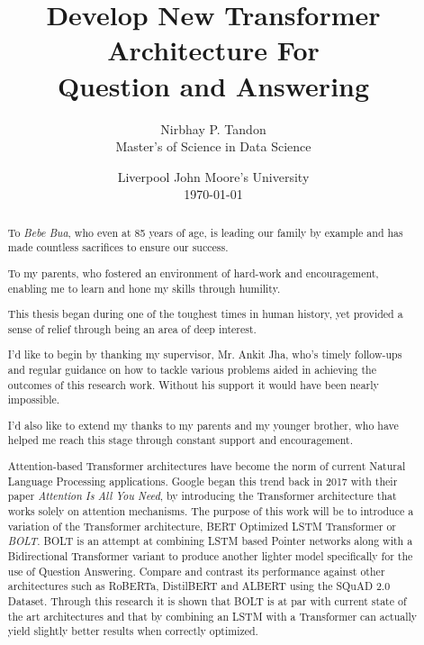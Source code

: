 \documentclass[a4paper,12pt]{report}
\begin{document}
    \title{Develop New Transformer Architecture For \\ Question and Answering}

    \author{Nirbhay P. Tandon\\ Master's of Science in Data Science}

    \date{\vfill Liverpool John Moore's University\\ \monthyeardate\today}
        \cleardoublepage%
    \maketitle
\clearpage
\renewcommand{\abstractname}{Dedication}
\begin{abstract}
	 To \textit{Bebe Bua}, who even at 85 years of age, is leading our family by example and has made countless sacrifices to ensure our success. 
	
	To my parents, who fostered an environment of hard-work and encouragement, enabling me to learn and hone my skills through humility.
\end{abstract}

\renewcommand{\abstractname}{Acknowledgements}
\begin{abstract}

	This thesis began during one of the toughest times in human history, yet provided a sense of relief through being an area of deep interest.
	
	I'd like to begin by thanking my supervisor, Mr. Ankit Jha, who's timely follow-ups and regular guidance on how to tackle various problems aided in achieving the outcomes of this research work. Without his support it would have been nearly impossible.
	
	I'd also like to extend my thanks to my parents and my younger brother, who have helped me reach this stage through constant support and encouragement. 
	
\end{abstract}
\renewcommand{\abstractname}{Abstract}
	\begin{abstract}
	Attention-based Transformer architectures have become the norm of current Natural Language Processing applications. Google began this trend back in 2017 with their paper \textit{Attention Is All You Need}, by introducing the Transformer architecture that works solely on attention mechanisms. The purpose of this work will be to introduce a variation of the Transformer architecture, BERT Optimized LSTM Transformer or \textit{BOLT}. BOLT is an attempt at combining LSTM based Pointer networks along with a Bidirectional Transformer variant to produce another lighter model specifically for the use of Question Answering. Compare and contrast its performance against other architectures such as RoBERTa, DistilBERT and ALBERT using the SQuAD 2.0 Dataset. Through this research it is shown that BOLT is at par with current state of the art architectures and that by combining an LSTM with a Transformer can actually yield slightly better results when correctly optimized.
	
\end{abstract}
\cleardoublepage%
\end{document}
